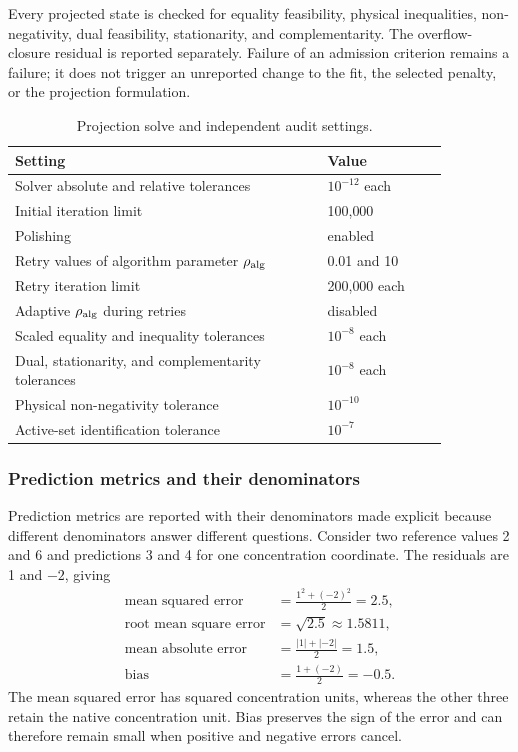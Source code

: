 Every projected state is checked for equality feasibility, physical inequalities, non-negativity, dual feasibility, stationarity, and complementarity. The overflow-closure residual is reported separately. Failure of an admission criterion remains a failure; it does not trigger an unreported change to the fit, the selected penalty, or the projection formulation.

\begin{table}[htbp]
\centering\small
\caption{Projection solve and independent audit settings.}
\label{tab:plant_projection_settings}
\begin{tabular}{p{0.62\linewidth}p{0.24\linewidth}}
\toprule Setting & Value\\\midrule
Solver absolute and relative tolerances & $10^{-12}$ each\\
Initial iteration limit & 100{,}000\\
Polishing & enabled\\
Retry values of algorithm parameter $\rho_{\rm alg}$ & 0.01 and 10\\
Retry iteration limit & 200{,}000 each\\
Adaptive $\rho_{\rm alg}$ during retries & disabled\\
Scaled equality and inequality tolerances & $10^{-8}$ each\\
Dual, stationarity, and complementarity tolerances & $10^{-8}$ each\\
Physical non-negativity tolerance & $10^{-10}$\\
Active-set identification tolerance & $10^{-7}$\\
\bottomrule
\end{tabular}
\end{table}

\subsubsection{Prediction metrics and their denominators}

Prediction metrics are reported with their denominators made explicit because different denominators answer different questions. Consider two reference values 2 and 6 and predictions 3 and 4 for one concentration coordinate. The residuals are 1 and $-2$, giving
\[
\begin{aligned}
\text{mean squared error}&=\frac{1^2+(-2)^2}{2}=2.5,\\
\text{root mean square error}&=\sqrt{2.5}\approx1.5811,\\
\text{mean absolute error}&=\frac{|1|+|-2|}{2}=1.5,\\
\text{bias}&=\frac{1+(-2)}{2}=-0.5.
\end{aligned}
\]
The mean squared error has squared concentration units, whereas the other three retain the native concentration unit. Bias preserves the sign of the error and can therefore remain small when positive and negative errors cancel.

